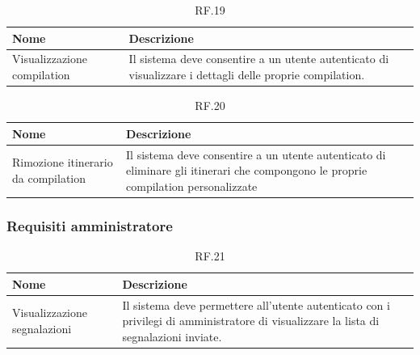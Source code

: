\documentclass{natourDoc}
\begin{document}
\begin{table}[H]
	\centering
	\begin{tabular}{ |p{5cm}|p{10.3cm}| }
		\hline
		\rowcolor{PineGreen!70}
		\textbf{Nome}               & \textbf{Descrizione}                                                          \\
		\hline
		Visualizzazione compilation & Il sistema deve consentire a un utente autenticato di visualizzare i dettagli
		delle proprie compilation.                                                                                  \\
		\hline
	\end{tabular}
	\caption{RF.19}
	\label{table:19}
\end{table}


\begin{table}[H]
	\centering
	\begin{tabular}{ |p{5cm}|p{10.3cm}| }
		\hline
		\rowcolor{PineGreen!70}
		\textbf{Nome}                       & \textbf{Descrizione}                                                          \\
		\hline
		Rimozione itinerario da compilation & Il sistema deve consentire a un utente autenticato di eliminare gli itinerari
		che compongono le proprie compilation personalizzate                                                                \\
		\hline
	\end{tabular}
	\caption{RF.20}
	\label{table:20}
\end{table}

\subsubsection{Requisiti amministratore}
\begin{table}[H]
	\centering
	\begin{tabular}{ |p{5cm}|p{10.3cm}| }
		\hline
		\rowcolor{PineGreen!70}
		\textbf{Nome}                & \textbf{Descrizione}                                                                                \\
		\hline
		Visualizzazione segnalazioni & Il sistema deve permettere all'utente autenticato con i privilegi di amministratore di visualizzare
		la lista di segnalazioni inviate.                                                                                                  \\
		\hline
	\end{tabular}
	\caption{RF.21}
	\label{table:21}
\end{table}
\end{document}
